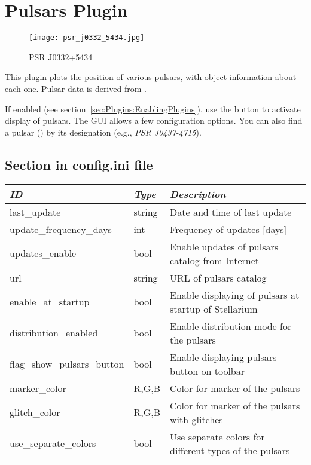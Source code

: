 \newpage

\section{Pulsars Plugin}
\label{sec:plugins:Pulsars}

\begin{figure}[ht]
\texttt{[image: psr\_j0332\_5434.jpg]}
\caption{PSR J0332+5434}
\label{fig:plugin:Pulsars}
\end{figure}

\noindent This plugin plots the position of various pulsars, with object
information about each one. Pulsar data is derived from .

If enabled (see section~\ref{sec:Plugins:EnablingPlugins}), use the
 button to activate display of
pulsars. The GUI allows a few configuration options.  You can also
find a pulsar () by its designation (e.g., \emph{PSR
  J0437-4715}).



\subsection{Section  in config.ini file}

\begin{tabularx}{\textwidth}{l|l|X}\toprule
\emph{ID}               & \emph{Type} & \emph{Description}\\\midrule
last\_update                & string & Date and time of last update\\%
update\_frequency\_days     & int    & Frequency of updates [days]\\%
updates\_enable             & bool   & Enable updates of pulsars catalog from Internet \\%
url                         & string & URL of pulsars catalog \\%
enable\_at\_startup         & bool   & Enable displaying of pulsars at startup of Stellarium \\%
distribution\_enabled       & bool   & Enable distribution mode for the pulsars \\%
flag\_show\_pulsars\_button & bool   & Enable displaying pulsars button on toolbar \\%
marker\_color               & R,G,B  & Color for marker of the pulsars \\%
glitch\_color               & R,G,B  & Color for marker of the pulsars with glitches \\%
use\_separate\_colors       & bool   & Use separate colors for different types of the pulsars \\\bottomrule
\end{tabularx}

